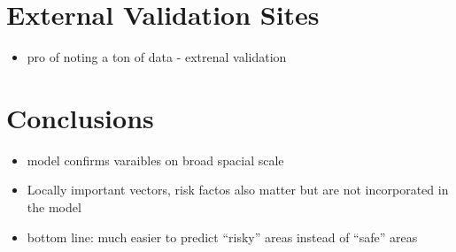 \documentclass{article}
\begin{document}
    \section{External Validation Sites}
        \begin{itemize}
            \item pro of noting a ton of data - extrenal validation
        \end{itemize}

    \section{Conclusions}
        \begin{itemize}
            \item model confirms varaibles on broad spacial scale
            \item Locally important vectors, risk factos also matter but are not incorporated in the model
            \item bottom line: much easier to predict ``risky'' areas instead of ``safe'' areas
        \end{itemize}
\end{document}
